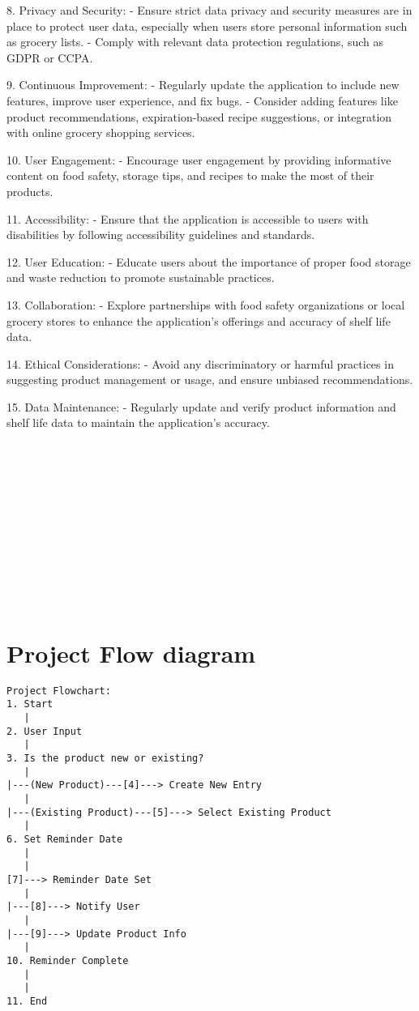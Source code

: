 8. Privacy and Security:
   - Ensure strict data privacy and security measures are in place to protect user data, especially when users store personal information such as grocery lists.
   - Comply with relevant data protection regulations, such as GDPR or CCPA.

9. Continuous Improvement:
   - Regularly update the application to include new features, improve user experience, and fix bugs.
   - Consider adding features like product recommendations, expiration-based recipe suggestions, or integration with online grocery shopping services.

10. User Engagement:
    - Encourage user engagement by providing informative content on food safety, storage tips, and recipes to make the most of their products.

11. Accessibility:
    - Ensure that the application is accessible to users with disabilities by following accessibility guidelines and standards.

12. User Education:
    - Educate users about the importance of proper food storage and waste reduction to promote sustainable practices.

13. Collaboration:
    - Explore partnerships with food safety organizations or local grocery stores to enhance the application's offerings and accuracy of shelf life data.

14. Ethical Considerations:
    - Avoid any discriminatory or harmful practices in suggesting product management or usage, and ensure unbiased recommendations.

15. Data Maintenance:
    - Regularly update and verify product information and shelf life data to maintain the application's accuracy. 
    \\ \\ \\ \\ \\ \\ \\ \\ \\ \\ \\ \\

\section{Project Flow diagram}

\begin{verbatim}
Project Flowchart:
1. Start
   |
2. User Input
   |
3. Is the product new or existing?
   |
|---(New Product)---[4]---> Create New Entry
   |
|---(Existing Product)---[5]---> Select Existing Product
   |
6. Set Reminder Date
   |
   |
[7]---> Reminder Date Set
   |
|---[8]---> Notify User
   |
|---[9]---> Update Product Info
   |
10. Reminder Complete
   |
   |
11. End
\end{verbatim} 

